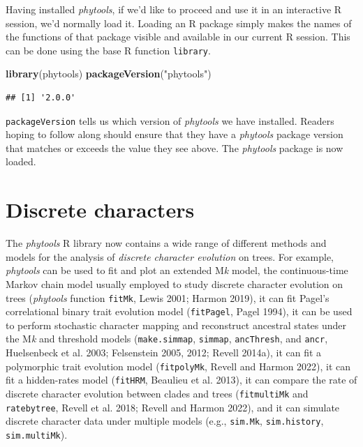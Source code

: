 \documentclass[fleqn,10pt,lineno]{wlpeerj} %
\newenvironment{Shaded}{\begin{snugshade}}{\end{snugshade}}
\newcommand{\FunctionTok}[1]{\textcolor[rgb]{0.13,0.29,0.53}{\textbf{#1}}}
\newcommand{\NormalTok}[1]{#1}
\newcommand{\StringTok}[1]{\textcolor[rgb]{0.31,0.60,0.02}{#1}}
\begin{document}
Having installed \emph{phytools}, if we'd like to proceed and use it in an interactive R session, we'd normally load it. Loading an R package simply makes the names of the functions of that package visible and available in our current R session. This can be done using the base R function \texttt{library}.

\begin{Shaded}
\begin{Highlighting}[]
\FunctionTok{library}\NormalTok{(phytools)}
\FunctionTok{packageVersion}\NormalTok{(}\StringTok{"phytools"}\NormalTok{)}
\end{Highlighting}
\end{Shaded}

\begin{verbatim}
## [1] '2.0.0'
\end{verbatim}

\texttt{packageVersion} tells us which version of \emph{phytools} we have installed. Readers hoping to follow along should ensure that they have a \emph{phytools} package version that matches or exceeds the value they see above. The \emph{phytools} package is now loaded.

\hypertarget{discrete-characters}{%
\section{Discrete characters}\label{discrete-characters}}

The \emph{phytools} R library now contains a wide range of different methods and models for the analysis of \emph{discrete character evolution} on trees. For example, \emph{phytools} can be used to fit and plot an extended M\emph{k} model, the continuous-time Markov chain model usually employed to study discrete character evolution on trees (\emph{phytools} function \texttt{fitMk}, Lewis 2001; Harmon 2019), it can fit Pagel's correlational binary trait evolution model (\texttt{fitPagel}, Pagel 1994), it can be used to perform stochastic character mapping and reconstruct ancestral states under the M\emph{k} and threshold models (\texttt{make.simmap}, \texttt{simmap}, \texttt{ancThresh}, and \texttt{ancr}, Huelsenbeck et al. 2003; Felsenstein 2005, 2012; Revell 2014a), it can fit a polymorphic trait evolution model (\texttt{fitpolyMk}, Revell and Harmon 2022), it can fit a hidden-rates model (\texttt{fitHRM}, Beaulieu et al. 2013), it can compare the rate of discrete character evolution between clades and trees (\texttt{fitmultiMk} and \texttt{ratebytree}, Revell et al. 2018; Revell and Harmon 2022), and it can simulate discrete character data under multiple models (e.g., \texttt{sim.Mk}, \texttt{sim.history}, \texttt{sim.multiMk}).
\end{document}
